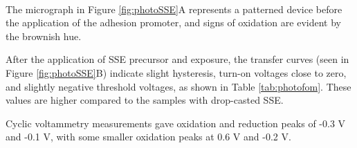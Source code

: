 \\

The micrograph in Figure \ref{fig:photoSSE}A represents a patterned device before the application of the adhesion promoter, and signs of oxidation are evident by the brownish hue. 

After the application of SSE precursor and exposure, the transfer curves (seen in Figure \ref{fig:photoSSE}B) indicate slight hysteresis, turn-on voltages close to zero, and slightly negative threshold voltages, as shown in Table \ref{tab:photofom}. These values are higher compared to the samples with drop-casted SSE. 

Cyclic voltammetry measurements gave oxidation and reduction peaks of -0.3 V and -0.1 V, with some smaller oxidation peaks at 0.6 V and -0.2 V. 


